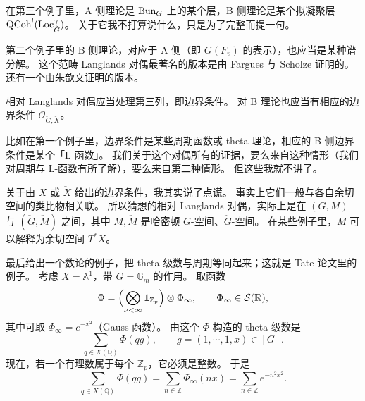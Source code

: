 在第三个例子里，A 侧理论是 $\operatorname{Bun}_G$ 上的某个层，B 侧理论是某个拟凝聚层 $\operatorname{QCoh}^!(\operatorname{Loc}^\gamma_{\check G})$。
关于它我不打算说什么，只是为了完整而提一句。

第二个例子里的 B 侧理论，对应于 A 侧（即 $G(F_v)$ 的表示），也应当是某种谱分解。
这个范畴 Langlands 对偶最著名的版本是由 Fargues 与 Scholze 证明的。
还有一个由朱歆文证明的版本。

相对 Langlands 对偶应当处理第三列，即边界条件。
对 B 理论也应当有相应的边界条件 $\mathcal O_{\check G,\check X}$。

比如在第一个例子里，边界条件是某些周期函数或 theta 理论，相应的 B 侧边界条件是某个「L-函数」。
我们关于这个对偶所有的证据，要么来自这种情形（我们对周期与 L-函数有所了解），要么来自第二种情形。
但这些我就不讲了。

关于由 $X$ 或 $\check X$ 给出的边界条件，我其实说了点谎。
事实上它们一般与各自余切空间的类比物相关联。
所以猜想的相对 Langlands 对偶，实际上是在 $(G,M)$ 与 $(\check G,\check M)$ 之间，其中 $M,\check M$ 是哈密顿 $G$-空间、$\check G$-空间。
在某些例子里，$M$ 可以解释为余切空间 $T^*X$。

最后给出一个数论的例子，把 theta 级数与周期等同起来；这就是 Tate 论文里的例子。
考虑 $X=\mathbb A^1$，带 $G=\mathbb G_m$ 的作用。
取函数
\[
  \Phi=\Bigl(\bigotimes_{\nu<\infty}\mathbf 1_{\mathbb Z_p}\Bigr)\otimes\Phi_\infty,
  \qquad \Phi_\infty\in\mathcal S(\mathbb R),
\]
其中可取 $\Phi_\infty=e^{-x^2}$（Gauss 函数）。
由这个 $\Phi$ 构造的 theta 级数是
\[
  \sum_{q\in X(\mathbb Q)}\Phi(qg),\qquad g=(1,\cdots,1,x)\in[G].
\]
现在，若一个有理数属于每个 $\mathbb Z_p$，它必须是整数。
于是
\[
  \sum_{q\in X(\mathbb Q)}\Phi(qg)=\sum_{n\in\mathbb Z}\Phi_\infty(nx)
  =\sum_{n\in\mathbb Z}e^{-n^2x^2}.
\]
